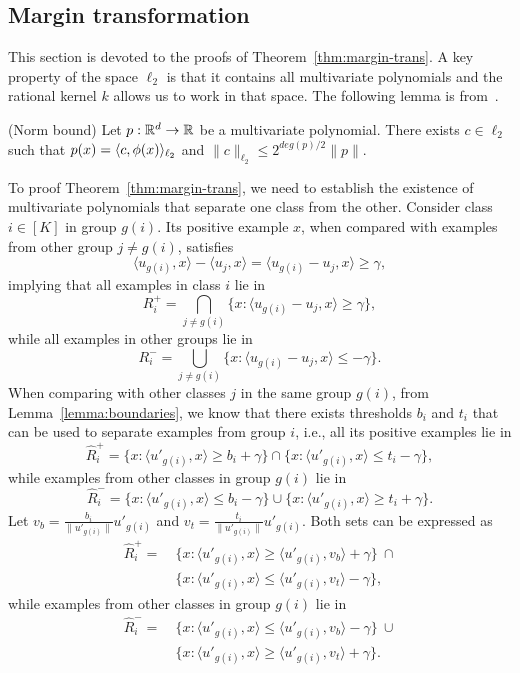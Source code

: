 \subsection{Margin transformation}

This section is devoted to the proofs of
Theorem~\ref{thm:margin-trans}.  A key property of the space $\ell_2$
is that it contains all multivariate polynomials and the rational
kernel $k$ allows us to work in that space.  The following lemma is
from~\cite{BeygelzimerPSTWZ2019-separable}.

\begin{lemma}
\label{lem:norm-bound}
(Norm bound) Let $p:{\mathbb{R}}^d\to {\mathbb{R}}$ be a multivariate polynomial. There exists $c\in \ell_2$ such that $p(x)=\langle c,\phi(x)\rangle_{\ell_2}$ and $\|c\|_{\ell_2}\leq 2^{deg(p)/2}\|p\|.$
\end{lemma}

To proof Theorem~\ref{thm:margin-trans}, we need to establish the
existence of multivariate polynomials that separate one class from the
other.  Consider class $i\in [K]$ in group $g(i)$.  Its positive
example $x$, when compared with examples from other group $j\neq
g(i)$, satisfies
\[
\langle u_{g(i)},x\rangle - \langle u_j,x\rangle
=
\langle u_{g(i)}-u_j,x\rangle 
\geq \gamma,
\]
implying that all examples in class $i$ lie in
\[
R^{+}_i = \bigcap_{j\neq g(i)}\{x : \langle u_{g(i)}-u_j,x\rangle \geq \gamma\}, 
\]
while all examples in other groups lie in
\[
R^{-}_i = \bigcup_{j\neq g(i)}\{x : \langle u_{g(i)}-u_j,x\rangle \leq -\gamma\}.
\]
When comparing with other classes $j$ in the same group $g(i)$, from
Lemma~\ref{lemma:boundaries}, we know that there exists thresholds
$b_i$ and $t_i$ that can be used to separate examples from group $i$,
i.e., all its positive examples lie in 
\[
\hat{R}^{+}_i=\{x : \langle u'_{g(i)},x\rangle \geq b_i+\gamma\}
\cap
\{x : \langle u'_{g(i)},x\rangle \leq t_i-\gamma\},
\]
while examples from other classes in group $g(i)$ lie in 
\[
\hat{R}^{-}_i=\{x : \langle u'_{g(i)},x\rangle \leq b_i-\gamma\}
\cup
\{x : \langle u'_{g(i)},x\rangle \geq t_i+\gamma\}.
\]
Let $v_b=\frac{b_i}{\|u'_{g(i)}\|}u'_{g(i)}$ and
$v_t=\frac{t_i}{\|u'_{g(i)}\|}u'_{g(i)}$.  Both sets can be expressed as
\begin{align*}
\hat{R}^{+}_i = & \ 
\{x : \langle u'_{g(i)},x\rangle \geq \langle u'_{g(i)},v_b \rangle+\gamma\} 
\ \cap \\
& \ \{x : \langle u'_{g(i)},x\rangle \leq \langle u'_{g(i)},v_t \rangle-\gamma\},
\end{align*}
while examples from other classes in group $g(i)$ lie in 
\begin{align*}
\hat{R}^{-}_i = & \
\{x : \langle u'_{g(i)},x\rangle \leq \langle u'_{g(i)},v_b \rangle-\gamma\}
\ \cup \\
& \ \{x : \langle u'_{g(i)},x\rangle \geq \langle u'_{g(i)},v_t \rangle+\gamma\}.
\end{align*}

